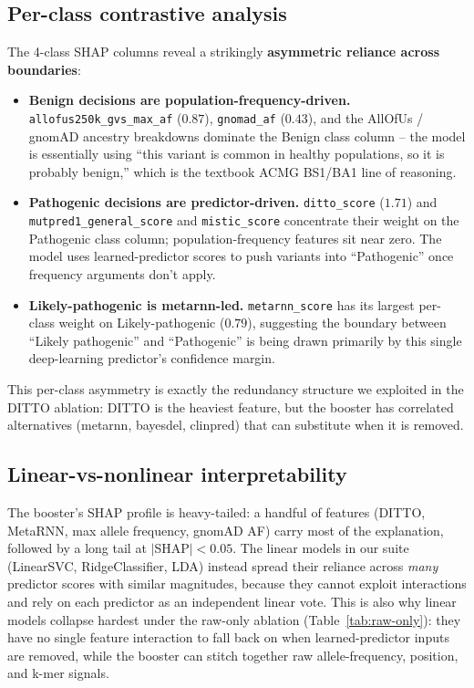 \documentclass[11pt,a4paper]{article}
\begin{document}
\subsection{Per-class contrastive analysis}

The 4-class SHAP columns reveal a strikingly \textbf{asymmetric reliance
across boundaries}:
\begin{itemize}[leftmargin=*]
 \item \textbf{Benign decisions are population-frequency-driven.}
 \texttt{allofus250k\_gvs\_max\_af} ($0.87$),
 \texttt{gnomad\_af} ($0.43$), and the AllOfUs / gnomAD ancestry
 breakdowns dominate the Benign class column -- the model is
 essentially using ``this variant is common in healthy populations,
 so it is probably benign,'' which is the textbook ACMG BS1/BA1
 line of reasoning.
 \item \textbf{Pathogenic decisions are predictor-driven.}
 \texttt{ditto\_score} ($1.71$) and \texttt{mutpred1\_general\_score}
 and \texttt{mistic\_score} concentrate their weight on the
 Pathogenic class column; population-frequency features sit near
 zero. The model uses learned-predictor scores to push variants into
 ``Pathogenic'' once frequency arguments don't apply.
 \item \textbf{Likely-pathogenic is metarnn-led.}
 \texttt{metarnn\_score} has its largest per-class weight on
 Likely-pathogenic ($0.79$), suggesting the boundary between
 ``Likely pathogenic'' and ``Pathogenic'' is being drawn primarily
 by this single deep-learning predictor's confidence margin.
\end{itemize}
This per-class asymmetry is exactly the redundancy structure we exploited in
the DITTO ablation: DITTO is the heaviest feature, but
the booster has correlated alternatives (metarnn, bayesdel, clinpred) that
can substitute when it is removed.

\subsection{Linear-vs-nonlinear interpretability}

The booster's SHAP profile is heavy-tailed: a handful of features (DITTO,
MetaRNN, max allele frequency, gnomAD AF) carry most of the explanation,
followed by a long tail at $|$SHAP$|<0.05$. The linear models in our suite
(LinearSVC, RidgeClassifier, LDA) instead spread their reliance across
\emph{many} predictor scores with similar magnitudes, because they cannot
exploit interactions and rely on each predictor as an independent linear
vote. This is also why linear models collapse hardest under the raw-only
ablation (Table~\ref{tab:raw-only}): they have no
single feature interaction to fall back on when learned-predictor inputs
are removed, while the booster can stitch together raw allele-frequency,
position, and k-mer signals.
\end{document}
